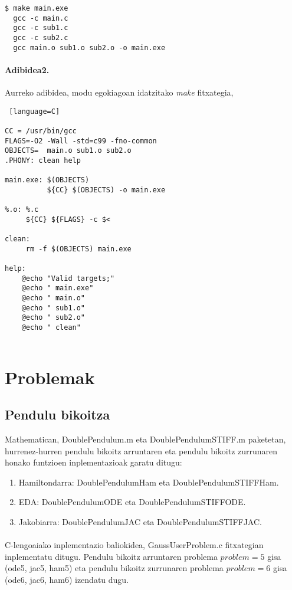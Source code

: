 \begin{lstlisting}
$ make main.exe
  gcc -c main.c
  gcc -c sub1.c
  gcc -c sub2.c
  gcc main.o sub1.o sub2.o -o main.exe
\end{lstlisting} 

\paragraph*{Adibidea2.} 
Aurreko adibidea, modu egokiagoan idatzitako \emph{make} fitxategia,

\begin{lstlisting} [language=C]

CC = /usr/bin/gcc
FLAGS=-O2 -Wall -std=c99 -fno-common 
OBJECTS=  main.o sub1.o sub2.o
.PHONY: clean help

main.exe: $(OBJECTS)
	      ${CC} $(OBJECTS) -o main.exe
	      
%.o: %.c
     ${CC} ${FLAGS} -c $<	      
	      
clean:
     rm -f $(OBJECTS) main.exe

help:
    @echo "Valid targets;"
    @echo " main.exe"
    @echo " main.o"
    @echo " sub1.o"
    @echo " sub2.o"
    @echo " clean"
             
\end{lstlisting}



\section{Problemak}

\subsection*{Pendulu bikoitza}

Mathematican,  DoublePendulum.m eta DoublePendulumSTIFF.m paketetan, hurrenez-hurren pendulu bikoitz arruntaren eta pendulu bikoitz zurrunaren honako funtzioen inplementazioak garatu ditugu:
\begin{enumerate}
   \item Hamiltondarra: DoublePendulumHam eta DoublePendulumSTIFFHam.
   \item EDA: DoublePendulumODE eta DoublePendulumSTIFFODE.
   \item Jakobiarra: DoublePendulumJAC eta DoublePendulumSTIFFJAC.
\end{enumerate}

\paragraph*{}C-lengoaiako inplementazio baliokidea, GaussUserProblem.c fitxategian inplementatu ditugu. Pendulu bikoitz arruntaren problema $problem=5$ gisa  (ode5, jac5, ham5) eta pendulu bikoitz zurrunaren problema $problem=6$ gisa (ode6, jac6, ham6) izendatu dugu.

